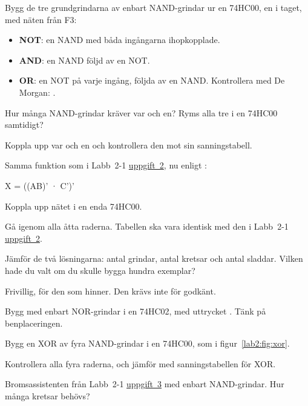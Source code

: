 \label{lab2:2:u2}
Bygg de tre grundgrindarna av enbart NAND-grindar ur en 74HC00, en i taget, med näten från F3:
\begin{itemize}
  \item \textbf{NOT}: en NAND med båda ingångarna ihopkopplade.
  \item \textbf{AND}: en NAND följd av en NOT.
  \item \textbf{OR}: en NOT på varje ingång, följda av en NAND. Kontrollera med De Morgan:
    .
\end{itemize}
\begin{parts}
  \item Hur många NAND-grindar kräver var och en? Ryms alla tre i en 74HC00 samtidigt?
  \item Koppla upp var och en och kontrollera den mot sin sanningstabell.
\end{parts}


\label{lab2:2:u3}
Samma funktion som i Labb~2-1 \hyperref[lab2:1:u2]{uppgift~2}, nu enligt :

\begin{textdrawing}
X = ((AB)' · C')'
\end{textdrawing}

\begin{parts}
  \item Koppla upp nätet i en enda 74HC00.
  \item Gå igenom alla åtta raderna. Tabellen ska vara identisk med den i Labb~2-1
    \hyperref[lab2:1:u2]{uppgift~2}.
  \item Jämför de två lösningarna: antal grindar, antal kretsar och antal sladdar. Vilken hade du
    valt om du skulle bygga hundra exemplar?
\end{parts}


\label{lab2:2:u4}
Frivillig, för den som hinner. Den krävs inte för godkänt.
\begin{parts}
  \item Bygg  med enbart NOR-grindar i en 74HC02, med uttrycket
    . Tänk på benplaceringen.
  \item Bygg en XOR av fyra NAND-grindar i en 74HC00, som i figur~\ref{lab2:fig:xor}.


    \noindent Kontrollera alla fyra raderna, och jämför med sanningstabellen för XOR.
  \item Bromsassistenten från Labb~2-1 \hyperref[lab2:1:u3]{uppgift~3} med enbart NAND-grindar.
    Hur många kretsar behövs?
\end{parts}

